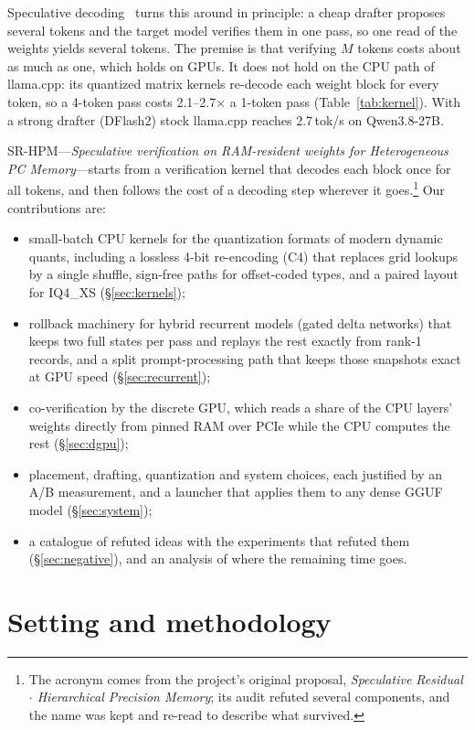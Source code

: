 \documentclass[10pt]{article}
\newcommand{\tps}{tok/s}
\begin{document}
Speculative decoding~\cite{leviathan,chen,eagle} turns this around in principle: a cheap drafter proposes several tokens
and the target model verifies them in one pass, so one read of the weights yields several tokens. The premise is that
verifying $M$ tokens costs about as much as one, which holds on GPUs. It does not hold on the CPU path of
llama.cpp: its quantized matrix kernels re-decode each weight block for every token, so a 4-token pass costs
2.1--2.7$\times$ a 1-token pass (Table~\ref{tab:kernel}). With a strong drafter (DFlash2) stock llama.cpp reaches
2.7\,\tps{} on Qwen3.8-27B.

SR-HPM---\emph{Speculative verification on RAM-resident weights for Heterogeneous PC Memory}---starts from a
verification kernel that decodes each block once for all tokens, and then follows the cost of a decoding step wherever
it goes.\footnote{The acronym comes from the project's original proposal, \emph{Speculative Residual $\cdot$
Hierarchical Precision Memory}; its audit refuted several components, and the name was kept and re-read to describe
what survived.} Our contributions are:
\begin{itemize}
\item small-batch CPU kernels for the quantization formats of modern dynamic quants, including a lossless 4-bit
re-encoding (C4) that replaces grid lookups by a single shuffle, sign-free paths for offset-coded types, and a
paired layout for IQ4\_XS (\S\ref{sec:kernels});
\item rollback machinery for hybrid recurrent models (gated delta networks) that keeps two full states per pass and
replays the rest exactly from rank-1 records, and a split prompt-processing path that keeps those snapshots exact at
GPU speed (\S\ref{sec:recurrent});
\item co-verification by the discrete GPU, which reads a share of the CPU layers' weights directly from pinned RAM
over PCIe while the CPU computes the rest (\S\ref{sec:dgpu});
\item placement, drafting, quantization and system choices, each justified by an A/B measurement, and a launcher
that applies them to any dense GGUF model (\S\ref{sec:system});
\item a catalogue of refuted ideas with the experiments that refuted them (\S\ref{sec:negative}), and an analysis of
where the remaining time goes.
\end{itemize}

\section{Setting and methodology}
\end{document}
